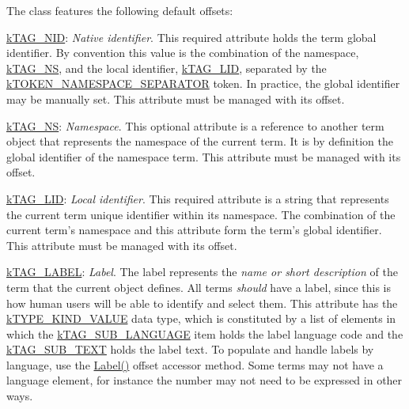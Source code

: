 The class features the following default offsets\-:


\begin{DoxyItemize}
\item {\ttfamily \hyperlink{}{k\-T\-A\-G\-\_\-\-N\-I\-D}}\-: {\itshape Native identifier}. This required attribute holds the term global identifier. By convention this value is the combination of the namespace, \hyperlink{}{k\-T\-A\-G\-\_\-\-N\-S}, and the local identifier, \hyperlink{}{k\-T\-A\-G\-\_\-\-L\-I\-D}, separated by the \hyperlink{}{k\-T\-O\-K\-E\-N\-\_\-\-N\-A\-M\-E\-S\-P\-A\-C\-E\-\_\-\-S\-E\-P\-A\-R\-A\-T\-O\-R} token. In practice, the global identifier may be manually set. This attribute must be managed with its offset. 
\item {\ttfamily \hyperlink{}{k\-T\-A\-G\-\_\-\-N\-S}}\-: {\itshape Namespace}. This optional attribute is a reference to another term object that represents the namespace of the current term. It is by definition the global identifier of the namespace term. This attribute must be managed with its offset. 
\item {\ttfamily \hyperlink{}{k\-T\-A\-G\-\_\-\-L\-I\-D}}\-: {\itshape Local identifier}. This required attribute is a string that represents the current term unique identifier within its namespace. The combination of the current term's namespace and this attribute form the term's global identifier. This attribute must be managed with its offset. 
\item {\ttfamily \hyperlink{}{k\-T\-A\-G\-\_\-\-L\-A\-B\-E\-L}}\-: {\itshape Label}. The label represents the {\itshape name or short description} of the term that the current object defines. All terms {\itshape should} have a label, since this is how human users will be able to identify and select them. This attribute has the \hyperlink{}{k\-T\-Y\-P\-E\-\_\-\-K\-I\-N\-D\-\_\-\-V\-A\-L\-U\-E} data type, which is constituted by a list of elements in which the \hyperlink{}{k\-T\-A\-G\-\_\-\-S\-U\-B\-\_\-\-L\-A\-N\-G\-U\-A\-G\-E} item holds the label language code and the \hyperlink{}{k\-T\-A\-G\-\_\-\-S\-U\-B\-\_\-\-T\-E\-X\-T} holds the label text. To populate and handle labels by language, use the \hyperlink{class_ontology_wrapper_1_1_term_object_a05ed3e9fdc652aec61870fa60a2d84aa}{Label()} offset accessor method. Some terms may not have a language element, for instance the number {} may not need to be expressed in other ways. 

\end{DoxyItemize}
